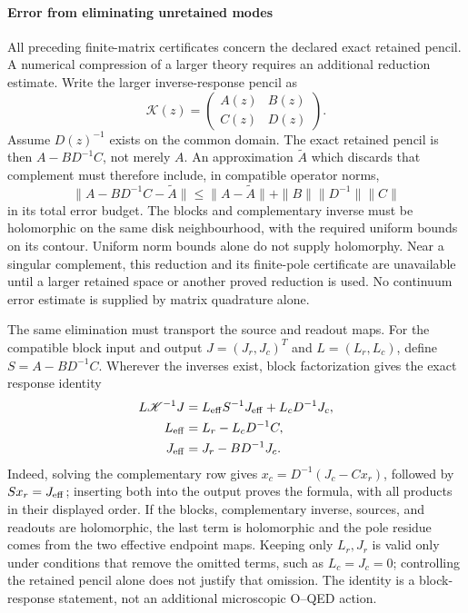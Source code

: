 \documentclass[final,5p,times,twocolumn,numbers,nopreprintline]{elsarticle}
\numberwithin{equation}{section}
\theoremstyle{definition}
\theoremstyle{remark}
\begin{document}
\paragraph{Error from eliminating unretained modes}
All preceding finite-matrix certificates concern the declared exact
retained pencil. A numerical compression of a larger theory requires
an additional reduction estimate. Write the larger inverse-response
pencil as
\[
 \mathscr K(z)=\begin{pmatrix}A(z)&B(z)\\C(z)&D(z)\end{pmatrix}.
\]
Assume \(D(z)^{-1}\) exists on the common domain. The exact retained
pencil is then \(A-BD^{-1}C\), not merely \(A\). An approximation \(\widetilde A\) which discards that complement
must therefore include, in compatible operator norms,
\begin{equation}
 \|A-BD^{-1}C-\widetilde A\|
 \leq\|A-\widetilde A\|+\|B\|\|D^{-1}\|\|C\|
 \label{eq:OQED-retained-complement-error}
\end{equation}
in its total error budget. The blocks and complementary inverse must
be holomorphic on the same disk neighbourhood, with the required
uniform bounds on its contour. Uniform norm bounds alone do not
supply holomorphy.
Near a singular complement, this reduction and its finite-pole
certificate are unavailable until a larger retained space or another
proved reduction is used. No continuum error estimate is supplied by
matrix quadrature alone.

The same elimination must transport the source and readout maps.
For the compatible block input and output
\(J=(J_r,J_c)^T\) and \(L=(L_r,L_c)\), define
\(S=A-BD^{-1}C\). Wherever the inverses exist, block factorization
gives the exact response identity
\begin{equation}
 \begin{aligned}
  L\mathscr K^{-1}J
     &=L_{\rm eff}S^{-1}J_{\rm eff}+L_cD^{-1}J_c,\\
  L_{\rm eff}&=L_r-L_cD^{-1}C,\\
  J_{\rm eff}&=J_r-BD^{-1}J_c.
 \end{aligned}
 \label{eq:OQED-Schur-source-readout}
\end{equation}
Indeed, solving the complementary row gives
\(x_c=D^{-1}(J_c-Cx_r)\), followed by
\(Sx_r=J_{\rm eff}\); inserting both into the output proves the
formula, with all products in their displayed order. If the blocks,
complementary inverse, sources, and readouts are holomorphic, the last
term is holomorphic and the pole residue comes from the two effective
endpoint maps. Keeping only \(L_r,J_r\) is valid only under conditions
that remove the omitted terms, such as \(L_c=J_c=0\); controlling the
retained pencil alone does not justify that omission. The identity is a
block-response statement, not an additional microscopic O--QED action.
\end{document}
